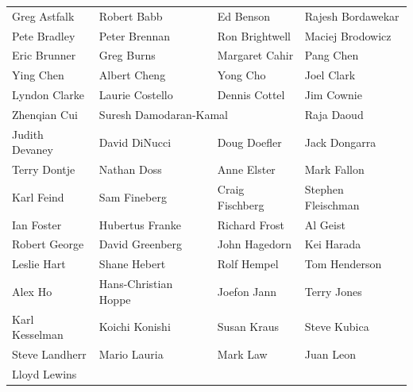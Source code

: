 \begin{center}
\begin{tabular}{llll}
Greg Astfalk &
Robert Babb &
Ed Benson &
Rajesh Bordawekar \\
Pete Bradley &
Peter Brennan &
Ron Brightwell &
Maciej Brodowicz \\
Eric Brunner &
Greg Burns &
Margaret Cahir &
Pang Chen \\
Ying Chen &
Albert Cheng &
Yong Cho &
Joel Clark \\
Lyndon Clarke &
Laurie Costello &
Dennis Cottel &
Jim Cownie \\
Zhenqian Cui &
\multicolumn{2}{l}{Suresh Damodaran-Kamal} &
Raja Daoud \\
Judith Devaney &
David DiNucci &
Doug Doefler &
Jack Dongarra \\
Terry Dontje &
Nathan Doss &
Anne Elster &
Mark Fallon \\
Karl Feind &
Sam Fineberg &
Craig Fischberg &
Stephen Fleischman \\
Ian Foster &
Hubertus Franke &
Richard Frost &
Al Geist \\
Robert George &
David Greenberg &
John Hagedorn &
Kei Harada \\
Leslie Hart &
Shane Hebert &
Rolf Hempel &
Tom Henderson \\
Alex Ho &
Hans-Christian Hoppe &
Joefon Jann &
Terry Jones \\
Karl Kesselman &
Koichi Konishi &
Susan Kraus &
Steve Kubica \\
Steve Landherr &
Mario Lauria &
Mark Law &
Juan Leon \\
Lloyd Lewins &


\end{tabular}
\end{center}
